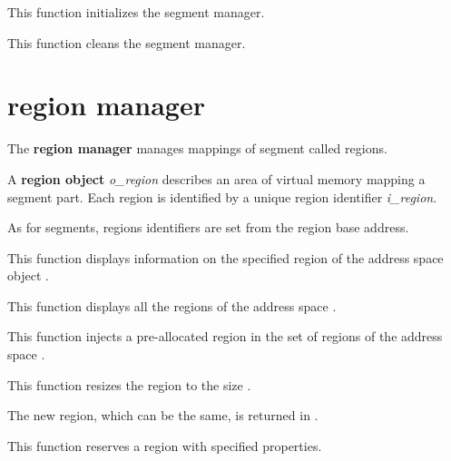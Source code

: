 	 {
	   This function initializes the segment manager.
	 }

	 {
	   This function cleans the segment manager.
	 }

%
%

\section{region manager}

The \textbf{region manager} manages mappings of segment called regions.

A \textbf{region object} \textit{o\_region} describes an area of virtual
memory mapping a segment part. Each region is identified by a unique region
identifier \textit{i\_region}.

As for segments, regions identifiers are set from the region base address.

	 {
	   This function displays information on the specified region
	    of the address space object .
	 }

	 {
	   This function displays all the regions of the address space
	   .
	 }

	 {
	   This function injects a pre-allocated region in the set of
	   regions of the address space .
	 }

	 {
	   This function resizes the region  to the
	   size .

	   The new region, which can be the same, is returned in
	   .
	 }

	 {
	   This function reserves a region with specified properties.
	 }

